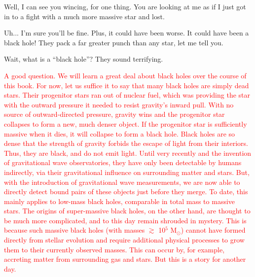 \documentclass[main.tex]{subfiles}
\begin{document}
\par \Maia Well, I can see you wincing, for one thing.  You are looking at me as if I just got in to a fight with a much more massive star and lost.

\par \Pleione Uh... I'm sure you'll be fine. Plus, it could have been worse.  It could have been a black hole!  They pack a far greater punch than any star, let me tell you.

\par \Maia Wait, what is a ``black hole''?  They sound terrifying.

\begin{tcolorbox}[sharp corners, colback=red!30, colframe=red!80!blue, title=Black Holes]
\par \textcolor{red} {A good question.  We will learn a great deal about black holes over the course of this book.  For now, let us suffice it to say that many black holes are simply dead stars. Their progenitor stars ran out of nuclear fuel, which was providing the star with the outward pressure it needed to resist gravity's inward pull.  With no source of outward-directed pressure, gravity wins and the progenitor star collapses to form a new, much denser object.  If the progenitor star is sufficiently massive when it dies, it will collapse to form a black hole.  %
Black holes are so dense that the strength of gravity forbids the escape of light from their interiors.  Thus, they are black, and do not emit light.  Until very recently and the invention of gravitational wave observatories, they have only been detectable by humans indirectly, via their gravitational influence on surrounding matter and stars.  But, with the introduction of gravitational wave measurements, we are now able to directly detect bound pairs of these objects just before they merge.  To date, this mainly applies to low-mass black holes, comparable in total mass to massive stars.  The origins of super-massive black holes, on the other hand, are thought to be much more complicated, and to this day remain shrouded in mystery.  This is because such massive black holes (with masses $\gtrsim$ 10$^5$ M$_{\odot}$) cannot have formed directly from stellar evolution and require additional physical processes to grow them to their currently observed masses.  This can occur by, for example, accreting matter from surrounding gas and stars.  But this is a story for another day.}
\end{tcolorbox}
\end{document}
